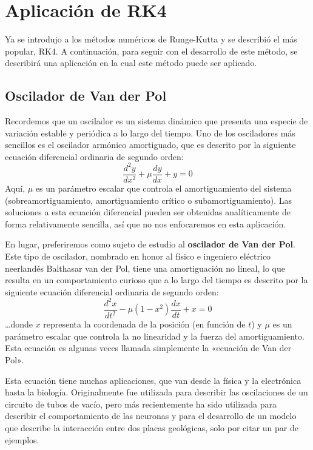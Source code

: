 \section{Aplicación de RK4}\label{sect:application}

Ya se introdujo a los métodos numéricos de Runge-Kutta y se describió el más popular, RK4. A continuación, para seguir con el desarrollo de este método, se describirá una aplicación en la cual este método puede ser aplicado.

\subsection{Oscilador de Van der Pol}

Recordemos que un oscilador es un sistema dinámico que presenta una especie de variación estable y periódica a lo largo del tiempo. Uno de los osciladores más sencillos es el oscilador armónico amortiguado, que es descrito por la siguiente ecuación diferencial ordinaria de segundo orden:
\[
	\frac{d^2 y}{dx^2} + \mu \frac{dy}{dx} + y = 0
\]
Aquí, \(\mu\) es un parámetro escalar que controla el amortiguamiento del sistema (sobreamortiguamiento, amortiguamiento crítico o subamortiguamiento). Las soluciones a esta ecuación diferencial pueden ser obtenidas analíticamente de forma relativamente sencilla, así que no nos enfocaremos en esta aplicación.

En lugar, preferiremos como sujeto de estudio al \textbf{oscilador de Van der Pol}. Este tipo de oscilador, nombrado en honor al físico e ingeniero eléctrico neerlandés Balthasar van der Pol, tiene una amortiguación no lineal, lo que resulta en un comportamiento curioso que a lo largo del tiempo es descrito por la siguiente ecuación diferencial ordinaria de segundo orden:
\begin{equation} \label{eq:van-der-pol}
	\frac{d^2 x}{dt^2} - \mu (1 - x^{2}) \frac{dx}{dt} + x = 0
\end{equation}
…donde \(x\) representa la coordenada de la posición (en función de \(t\)) y \(\mu\) es un parámetro escalar que controla la no linearidad y la fuerza del amortiguamiento. Esta ecuación es algunas veces llamada simplemente la «ecuación de Van der Pol».

Esta ecuación tiene muchas aplicaciones, que van desde la física y la electrónica hasta la biología. Originalmente fue utilizada para describir las oscilaciones de un circuito de tubos de vacío, pero más recientemente ha sido utilizada para describir el comportamiento de las neuronas y para el desarrollo de un modelo que describe la interacción entre dos placas geológicas, solo por citar un par de ejemplos.

